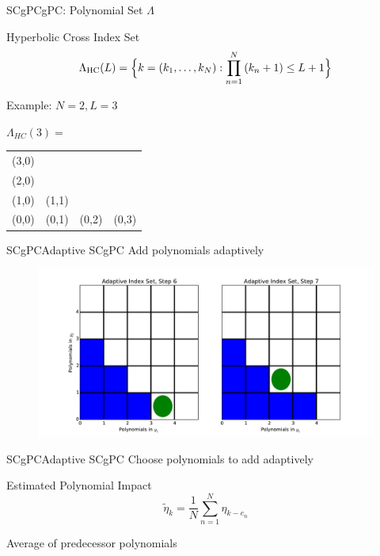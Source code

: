 \documentclass{beamer}
\begin{document}
\begin{frame}{SCgPC}{gPC: Polynomial Set $\Lambda$}%
  \vfill
  \centering
  \begin{exampleblock}{Hyperbolic Cross Index Set}
    \[\Lambda_\text{HC}(L)=\Big\{k=(k_1,\ldots,k_N):\prod_{n=1}^N\qty(k_n+1) \leq L+1 \Big\}\]
  \end{exampleblock}
  \vfill
  Example: $N=2,L=3$
  \vfill
    \begin{table}\centering
      $\Lambda_{HC}(3)=$
      \begin{tabular}{|c c c c|} \hline
        (3,0) &       &       &       \\
        (2,0) &       &       &       \\
        (1,0) & (1,1) &       &       \\
        (0,0) & (0,1) & (0,2) & (0,3) \\ \hline
      \end{tabular}
    \end{table}
  \vfill
\end{frame}

\begin{frame}{SCgPC}{Adaptive SCgPC}%
  Add polynomials adaptively
    \begin{figure}[h!]
      \centering
      \includegraphics[width=\linewidth]{asc_step}
    \end{figure}
\end{frame}

\begin{frame}{SCgPC}{Adaptive SCgPC}%
  \vfill
  Choose polynomials to add adaptively
  \vfill
  \begin{block}{Estimated Polynomial Impact}
    \begin{equation*}
        \tilde \eta_k = \frac{1}{N}\sum_{n=1}^N \eta_{k-e_n}
    \end{equation*}
  \end{block}
  \vfill
  Average of predecessor polynomials
  \vfill
\end{frame}
\end{document}
